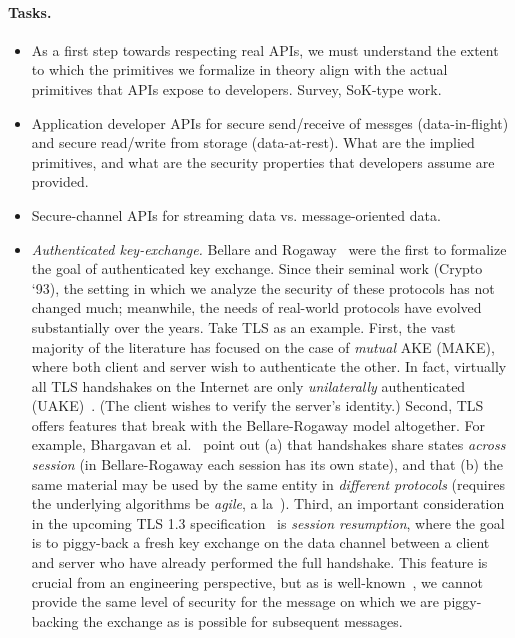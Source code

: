 \paragraph{Tasks.} 
\begin{itemize}
\item As a first step towards respecting real APIs, we must understand the extent to
which the primitives we formalize in theory align with the actual primitives
that APIs expose to developers. {Survey, SoK-type work.}
\item {Application developer APIs for secure send/receive of messges
(data-in-flight) and secure read/write from storage (data-at-rest).  What are
the implied primitives, and what are the security properties that developers
assume are provided.}
\item {Secure-channel APIs for streaming data vs.
message-oriented data.}  

  \item \emph{Authenticated key-exchange.}
    Bellare and Rogaway~\cite{bellare1993entity} were the first to formalize the
    goal of authenticated key exchange. Since their seminal work (Crypto `93),
    the setting in which we analyze the security of these protocols has not
    changed much; meanwhile, the needs of real-world protocols have evolved
    substantially over the years. Take TLS as an example.
    First, the vast majority of the literature has focused on the case of
    \emph{mutual} AKE (MAKE), where both client and server wish to authenticate the
    other. In fact, virtually all TLS handshakes on the Internet are only
    \emph{unilaterally} authenticated (UAKE)~\cite{xxx}. (The client
    wishes to verify the server's identity.)
    Second, TLS offers features that break with the Bellare-Rogaway model
    altogether. For example, Bhargavan et al.~\cite{bhargavan2014proving} point
    out (a) that handshakes share states \emph{across session} (in
    Bellare-Rogaway each session has its own state), and that (b) the same
    material may be used by the same entity in \emph{different protocols}
    (requires the underlying algorithms be \emph{agile}, a
    la~\cite{acar2010cryptographic}).
    Third, an important consideration in the upcoming TLS 1.3
    specification~\cite{tls13} is \emph{session resumption}, where the goal is
    to piggy-back a fresh key exchange on the data channel between a client and
    server who have already performed the full handshake. This feature is
    crucial from an engineering perspective, but as is well-known~\cite{xxx}, we
    cannot provide the same level of security for the message on which we are
    piggy-backing the exchange as is possible for subsequent messages.


\end{itemize}
